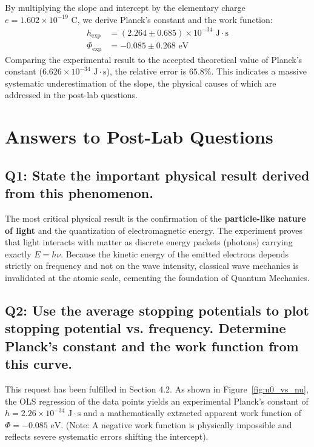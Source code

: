 \documentclass[a4paper,11pt]{article}
\begin{document}
By multiplying the slope and intercept by the elementary charge $e = 1.602 \times 10^{-19}\text{ C}$, we derive Planck's constant and the work function:
\begin{align*}
    h_{\text{exp}} &= (2.264 \pm 0.685) \times 10^{-34}\text{ J}\cdot\text{s} \\
    \Phi_{\text{exp}} &= -0.085 \pm 0.268\text{ eV}
\end{align*}
Comparing the experimental result to the accepted theoretical value of Planck's constant ($6.626 \times 10^{-34}\text{ J}\cdot\text{s}$), the relative error is $65.8\%$. This indicates a massive systematic underestimation of the slope, the physical causes of which are addressed in the post-lab questions.

\section{Answers to Post-Lab Questions}

\subsection*{Q1: State the important physical result derived from this phenomenon.}
The most critical physical result is the confirmation of the \textbf{particle-like nature of light} and the quantization of electromagnetic energy. The experiment proves that light interacts with matter as discrete energy packets (photons) carrying exactly $E = h\nu$. Because the kinetic energy of the emitted electrons depends strictly on frequency and not on the wave intensity, classical wave mechanics is invalidated at the atomic scale, cementing the foundation of Quantum Mechanics.

\subsection*{Q2: Use the average stopping potentials to plot stopping potential vs. frequency. Determine Planck's constant and the work function from this curve.}
This request has been fulfilled in Section 4.2. As shown in Figure~\ref{fig:u0_vs_nu}, the OLS regression of the data points yields an experimental Planck's constant of $h = 2.26 \times 10^{-34}\text{ J}\cdot\text{s}$ and a mathematically extracted apparent work function of $\Phi = -0.085\text{ eV}$. (Note: A negative work function is physically impossible and reflects severe systematic errors shifting the intercept).
\end{document}
